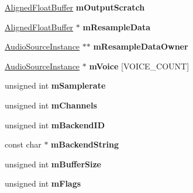 \begin{DoxyCompactItemize}
\mbox{\hyperlink{class_so_loud_1_1_aligned_float_buffer}{Aligned\+Float\+Buffer}} {\bfseries m\+Output\+Scratch}
\item 
\mbox{\label{class_so_loud_1_1_soloud_a976e18d1cec97fcf369f7bcc5d679775}} 
\mbox{\hyperlink{class_so_loud_1_1_aligned_float_buffer}{Aligned\+Float\+Buffer}} $\ast$ {\bfseries m\+Resample\+Data}
\item 
\mbox{\label{class_so_loud_1_1_soloud_a8bf3debeac7f8d630ae61ba1eb3fc80c}} 
\mbox{\hyperlink{class_so_loud_1_1_audio_source_instance}{Audio\+Source\+Instance}} $\ast$$\ast$ {\bfseries m\+Resample\+Data\+Owner}
\item 
\mbox{\label{class_so_loud_1_1_soloud_a931cbaf9ce4c19817a306e90c953a3b1}} 
\mbox{\hyperlink{class_so_loud_1_1_audio_source_instance}{Audio\+Source\+Instance}} $\ast$ {\bfseries m\+Voice} \mbox{[}V\+O\+I\+C\+E\+\_\+\+C\+O\+U\+NT\mbox{]}
\item 
\mbox{\label{class_so_loud_1_1_soloud_a1811a1e5f7104a1d880099b7e7b70c0a}} 
unsigned int {\bfseries m\+Samplerate}
\item 
\mbox{\label{class_so_loud_1_1_soloud_ac3a7fa610e2ea337ffde5616e19e2037}} 
unsigned int {\bfseries m\+Channels}
\item 
\mbox{\label{class_so_loud_1_1_soloud_ae818b4532985178526e971825e719c00}} 
unsigned int {\bfseries m\+Backend\+ID}
\item 
\mbox{\label{class_so_loud_1_1_soloud_af4a3897977fa03603f5371bc17c31ee6}} 
const char $\ast$ {\bfseries m\+Backend\+String}
\item 
\mbox{\label{class_so_loud_1_1_soloud_a2955ea1257ccbd67c1e89eb9f3ec0a41}} 
unsigned int {\bfseries m\+Buffer\+Size}
\item 
\mbox{\label{class_so_loud_1_1_soloud_a57011ff042e631904b3534686a6a1064}} 
unsigned int {\bfseries m\+Flags}
\item 
\mbox{\label{class_so_loud_1_1_soloud_af1618ff2106c3eac3355651c4d50a050}} 
$$
\end{DoxyCompactItemize}
